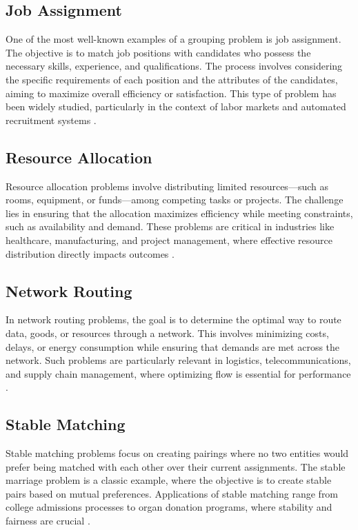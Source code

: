     \subsection{Job Assignment} \label{subsec:job_assignment}
        One of the most well-known examples of a grouping problem is job assignment. The objective is to match job positions with candidates who possess the necessary skills, experience, and qualifications. The process involves considering the specific requirements of each position and the attributes of the candidates, aiming to maximize overall efficiency or satisfaction. This type of problem has been widely studied, particularly in the context of labor markets and automated recruitment systems \cite{roth1990two}.

    \subsection{Resource Allocation} \label{subsec:resource_allocation}
        Resource allocation problems involve distributing limited resources—such as rooms, equipment, or funds—among competing tasks or projects. The challenge lies in ensuring that the allocation maximizes efficiency while meeting constraints, such as availability and demand. These problems are critical in industries like healthcare, manufacturing, and project management, where effective resource distribution directly impacts outcomes \cite{schrijver2003combinatorial}.
    
    \subsection{Network Routing} \label{subsec:network_routing}
        In network routing problems, the goal is to determine the optimal way to route data, goods, or resources through a network. This involves minimizing costs, delays, or energy consumption while ensuring that demands are met across the network. Such problems are particularly relevant in logistics, telecommunications, and supply chain management, where optimizing flow is essential for performance \cite{ahuja1993network}.
    
    \subsection{Stable Matching} \label{subsec:stable_matching}
        Stable matching problems focus on creating pairings where no two entities would prefer being matched with each other over their current assignments. The stable marriage problem is a classic example, where the objective is to create stable pairs based on mutual preferences. Applications of stable matching range from college admissions processes to organ donation programs, where stability and fairness are crucial \cite{gusfield1989stable, demange1986multi}.
    
